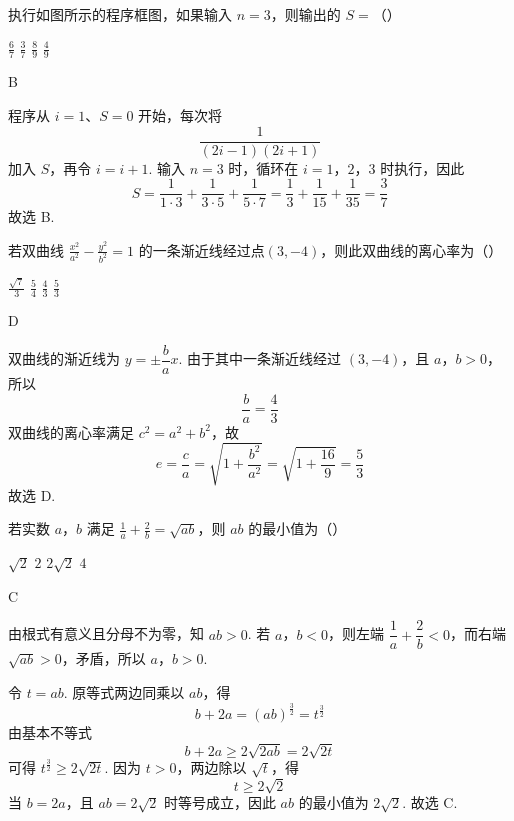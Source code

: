 \begin{problem}
执行如图所示的程序框图，如果输入 \(n=3\)，则输出的 \(S=\)（\quad）


\choices
    {\(\frac{6}{7}\)}
    {\(\frac{3}{7}\)}
    {\(\frac{8}{9}\)}
    {\(\frac{4}{9}\)}
\end{problem}

\begin{answer}
B
\end{answer}

\begin{solution}
程序从 \(i=1\)、\(S=0\) 开始，每次将
\[
\frac{1}{(2i-1)(2i+1)}
\]
加入 \(S\)，再令 \(i=i+1\). 输入 \(n=3\) 时，循环在 \(i=1\)，\(2\)，\(3\) 时执行，因此
\[
S=\frac{1}{1\cdot3}+\frac{1}{3\cdot5}+\frac{1}{5\cdot7}
 =\frac13+\frac1{15}+\frac1{35}=\frac37
\]
故选 B.
\end{solution}

\begin{problem}
若双曲线 \(\frac{x^2}{a^2} - \frac{y^2}{b^2} = 1\) 的一条渐近线经过点\((3,-4)\)，则此双曲线的离心率为（\quad）

\choices
    {\( \frac{\sqrt{7}}{3} \)}
    {\( \frac{5}{4} \)}
    {\( \frac{4}{3} \)}
    {\( \frac{5}{3} \)}
\end{problem}

\begin{answer}
D
\end{answer}

\begin{solution}
双曲线的渐近线为 \(y=\pm\dfrac{b}{a}x\). 由于其中一条渐近线经过 \((3,-4)\)，且 \(a\)，\(b>0\)，所以
\[
\frac{b}{a}=\frac43
\]
双曲线的离心率满足 \(c^2=a^2+b^2\)，故
\[
e=\frac{c}{a}=\sqrt{1+\frac{b^2}{a^2}}=\sqrt{1+\frac{16}{9}}=\frac53
\]
故选 D.
\end{solution}

\begin{problem}
若实数 \(a\)，\(b\) 满足 \(\frac{1}{a} + \frac{2}{b} = \sqrt{ab}\)，则 \(ab\) 的最小值为（\quad）

\choices
    {\(\sqrt{2}\)}
    {\(2\)}
    {\(2 \sqrt{2}\)}
    {\(4\)}
\end{problem}

\begin{answer}
C
\end{answer}

\begin{solution}
由根式有意义且分母不为零，知 \(ab>0\). 若 \(a\)，\(b<0\)，则左端 \(\dfrac1a+\dfrac2b<0\)，而右端 \(\sqrt{ab}>0\)，矛盾，所以 \(a\)，\(b>0\).

令 \(t=ab\). 原等式两边同乘以 \(ab\)，得
\[
b+2a=(ab)^{\frac{3}{2}}=t^{\frac{3}{2}}
\]
由基本不等式
\[
b+2a\geqslant2\sqrt{2ab}=2\sqrt{2t}
\]
可得 \(t^{\frac{3}{2}}\geqslant2\sqrt{2t}\). 因为 \(t>0\)，两边除以 \(\sqrt t\)，得
\[
t\geqslant2\sqrt2
\]
当 \(b=2a\)，且 \(ab=2\sqrt2\) 时等号成立，因此 \(ab\) 的最小值为 \(2\sqrt2\). 故选 C.
\end{solution}

